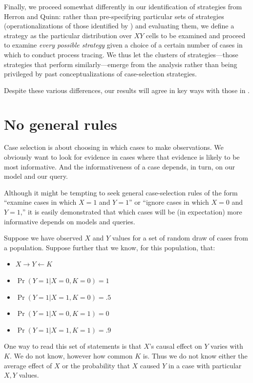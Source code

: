 \documentclass[
  12pt,
]{book}
\providecommand{\tightlist}{%
  \setlength{\itemsep}{0pt}\setlength{\parskip}{0pt}}
\begin{document}
Finally, we proceed somewhat differently in our identification of strategies from Herron and Quinn: rather than pre-specifying particular sets of strategies (operationalizations of those identified by \citet{SeawrightGerring2008}) and evaluating them, we define a strategy as the particular distribution over \(XY\) cells to be examined and proceed to examine \emph{every possible strategy} given a choice of a certain number of cases in which to conduct process tracing. We thus let the clusters of strategies---those strategies that perform similarly---emerge from the analysis rather than being privileged by past conceptualizations of case-selection strategies.

Despite these various differences, our results will agree in key ways with those in \citet{HerronQuinn}.

\hypertarget{no-general-rules}{%
\section{No general rules}\label{no-general-rules}}

Case selection is about choosing in which cases to make observations. We obviously want to look for evidence in cases where that evidence is likely to be most informative. And the informativeness of a case depends, in turn, on our model and our query.

Although it might be tempting to seek general case-selection rules of the form ``examine cases in which \(X=1\) and \(Y=1\)'' or ``ignore cases in which \(X=0\) and \(Y=1\),'' it is easily demonstrated that which cases will be (in expectation) more informative depends on models and queries.

Suppose we have observed \(X\) and \(Y\) values for a set of random draw of cases from a population. Suppose further that we know, for this population, that:

\begin{itemize}
\tightlist
\item
  \(X \rightarrow Y \leftarrow K\)
\item
  \(\Pr(Y=1|X=0, K = 0) = 1\)
\item
  \(\Pr(Y=1|X=1, K = 0) = .5\)
\item
  \(\Pr(Y=1|X=0, K = 1) = 0\)
\item
  \(\Pr(Y=1|X=1, K = 1) = .9\)
\end{itemize}

One way to read this set of statements is that \(X\)'s causal effect on \(Y\) varies with \(K\). We do not know, however how common \(K\) is. Thus we do not know either the average effect of \(X\) or the probability that \(X\) caused \(Y\) in a case with particular \(X, Y\) values.
\end{document}
